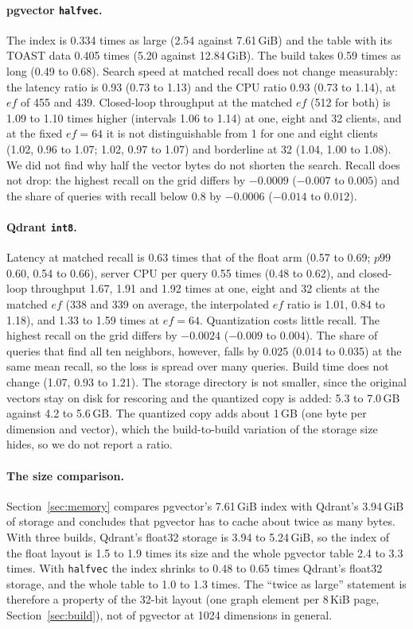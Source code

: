 \documentclass[sigconf, nonacm]{acmart}
\begin{document}
\paragraph{pgvector \texttt{halfvec}.} The index is 0.334 times as large (2.54 against 7.61\,GiB)
and the table with its TOAST data 0.405 times (5.20 against 12.84\,GiB). The build takes 0.59
times as long (0.49 to 0.68). Search speed at matched recall does not change measurably: the
latency ratio is 0.93 (0.73 to 1.13) and the CPU ratio 0.93 (0.73 to 1.14), at $ef$ of 455 and 439. Closed-loop throughput at the
matched $ef$ (512 for both) is 1.09 to 1.10 times higher (intervals 1.06 to 1.14) at one, eight and 32 clients, and
at the fixed $ef=64$ it is not distinguishable from 1 for one and eight clients (1.02, 0.96 to 1.07; 1.02, 0.97 to 1.07) and borderline at 32 (1.04, 1.00 to 1.08).
We did not find
why half the vector bytes do not shorten the search. Recall does not drop: the highest recall on
the grid differs by $-0.0009$ ($-0.007$ to $0.005$) and the share of queries with recall below 0.8 by
$-0.0006$ ($-0.014$ to $0.012$).

\paragraph{Qdrant \texttt{int8}.} Latency at matched recall is 0.63 times that of the float
arm (0.57 to 0.69; $p99$ 0.60, 0.54 to 0.66), server CPU per query 0.55 times (0.48 to 0.62), and closed-loop throughput 1.67, 1.91 and 1.92
times at one, eight and 32 clients at the matched $ef$ (338 and 339 on average, the
interpolated $ef$ ratio is 1.01, 0.84 to 1.18), and 1.33 to 1.59 times at $ef=64$. Quantization costs
little recall. The highest recall on the grid differs by $-0.0024$ ($-0.009$ to $0.004$). The share
of queries that find all ten neighbors, however, falls by 0.025 (0.014 to 0.035) at the same mean
recall, so the loss is spread over many queries. Build time does not change (1.07, 0.93 to 1.21). The
storage directory is not smaller, since the original vectors stay on disk for rescoring and the
quantized copy is added: 5.3 to 7.0\,GB against 4.2 to 5.6\,GB. The quantized copy adds about
1\,GB (one byte per dimension and vector), which the build-to-build variation of the storage size hides,
so we do not report a ratio.

\paragraph{The size comparison.} Section~\ref{sec:memory} compares pgvector's 7.61\,GiB index with
Qdrant's 3.94\,GiB of storage and concludes that pgvector has to cache about twice as many bytes. With three
builds, Qdrant's float32 storage is 3.94 to 5.24\,GiB, so the index of the float layout is 1.5 to 1.9
times its size and the whole pgvector table 2.4 to 3.3 times. With \texttt{halfvec} the index shrinks to 0.48 to 0.65
times Qdrant's float32 storage, and the whole table to 1.0 to 1.3 times. The ``twice as large'' statement is therefore a
property of the 32-bit layout (one graph element per 8\,KiB page, Section~\ref{sec:build}), not of
pgvector at 1024 dimensions in general.
\end{document}
